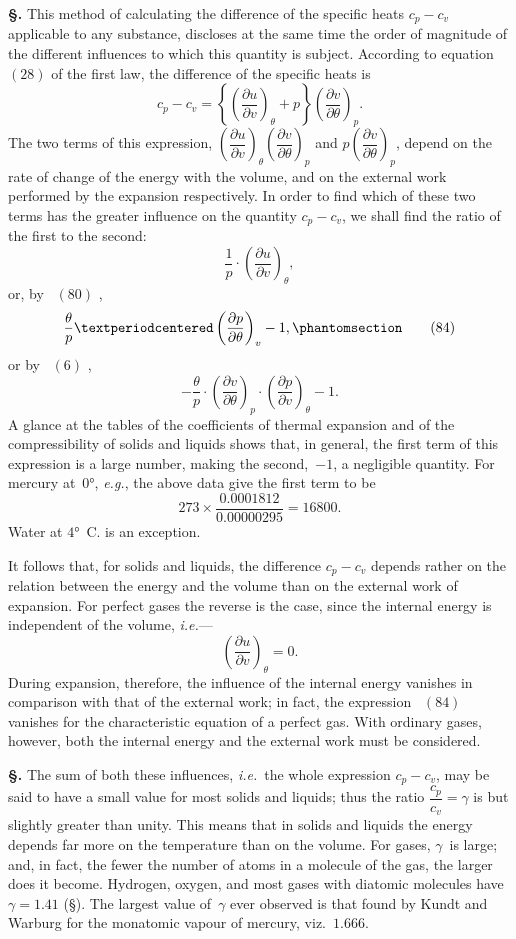 \documentclass[12pt]{book}[2005/09/16]
\newcommand{\Chg}[2]{#2}
\newcommand{\Add}[1]{\Chg{}{#1}}
\newcommand{\Section}[1]{
  \medskip\par\textbf{§\;#1}
  \label{section:#1}
}
\newcommand{\SecRef}[2][§\;]{\hyperref[section:#2.]{{\upshape #1#2}}}
\newcommand{\Tag}[1]{%
  \phantomsection\label{eqn:#1}\tag*{\ensuremath{#1}}%
}
\newcommand{\Eq}[1]{%
  \hyperref[eqn:#1]{\ensuremath{#1}}%
}
\newcommand{\PageSep}[1]{\ignorespaces}
\newcommand{\eg}{\emph{e.g.}}
\newcommand{\ie}{\emph{i.e.}}
\newcommand{\dd}{\partial}
\begin{document}
\Section{155.} This method of calculating the difference of the
%
%
specific heats $c_{p} - c_{v}$ applicable to any substance, discloses
at the same time the order of magnitude of the different
influences to which this quantity is subject. According to
equation~\Eq{(28)} of the first law, the difference of the specific
heats is
\[
c_{p} - c_{v} = \left\{\left(\frac{\dd u}{\dd v}\right)_{\theta} + p\right\} \left(\frac{\dd v}{\dd \theta}\right)_{p}\Add{.}
\]
The two terms of this expression, $\left(\dfrac{\dd u}{\dd v}\right)_{\theta} \left(\dfrac{\dd v}{\dd \theta}\right)_{p}$ and $p\left(\dfrac{\dd v}{\dd \theta}\right)_{p}$,
depend on the rate of change of the energy with the volume,
and on the external work performed by the expansion
respectively. In order to find which of these two terms has
the greater influence on the quantity $c_{p} - c_{v}$, we shall find
the ratio of the first to the second:
\[
\frac{1}{p} · \left(\frac{\dd u}{\dd v}\right)_{\theta},
\]
or, by~\Eq{(80)},
\[
\frac{\theta}{p} · \left(\frac{\dd p}{\dd \theta}\right)_{v} - 1\Add{,}
\Tag{(84)}
\]
or by~\Eq{(6)},
\[
-\frac{\theta}{p} · \left(\frac{\dd v}{\dd \theta}\right)_{p} · \left(\frac{\dd p}{\dd v}\right)_{\theta} - 1\Add{.}
\]
\PageSep{122}
A glance at the tables of the coefficients of thermal
expansion and of the compressibility of solids and liquids
shows that, in general, the first term of this expression is
a large number, making the second,~$-1$, a negligible
quantity. For mercury at~$0°$, \eg, the above data give the
first term to be
\[
273 × \frac{0.0001812}{0.00000295} = 16800.
\]
Water at $4°$~C. is an exception.

It follows that, for solids and liquids, the difference
$c_{p} - c_{v}$ depends rather on the relation between the energy
and the volume than on the external work of expansion.
For perfect gases the reverse is the case, since the internal
energy is independent of the volume, \ie---
\[
\left(\frac{\dd u}{\dd v}\right)_{\theta} = 0.
\]
During expansion, therefore, the influence of the internal
energy vanishes in comparison with that of the external
work; in fact, the expression~\Eq{(84)} vanishes for the characteristic
equation of a perfect gas. With ordinary gases,
however, both the internal energy and the external work
must be considered.

\Section{156.} The sum of both these influences, \ie\ the whole
%
%
expression $c_{p} - c_{v}$, may be said to have a small value for
most solids and liquids; thus the ratio $\dfrac{c_{p}}{c_{v}} = \gamma$ is but slightly
greater than unity. This means that in solids and liquids
the energy depends far more on the temperature than on the
volume. For gases, $\gamma$~is large; and, in fact, the fewer the
number of atoms in a molecule of the gas, the larger does
it become. Hydrogen, oxygen, and most gases with diatomic
molecules have $\gamma = 1.41$ (\SecRef{87}). The largest value of~$\gamma$ ever
observed is that found by Kundt and Warburg for the
%
%
monatomic vapour of mercury, viz.~$1.666$.
\end{document}
